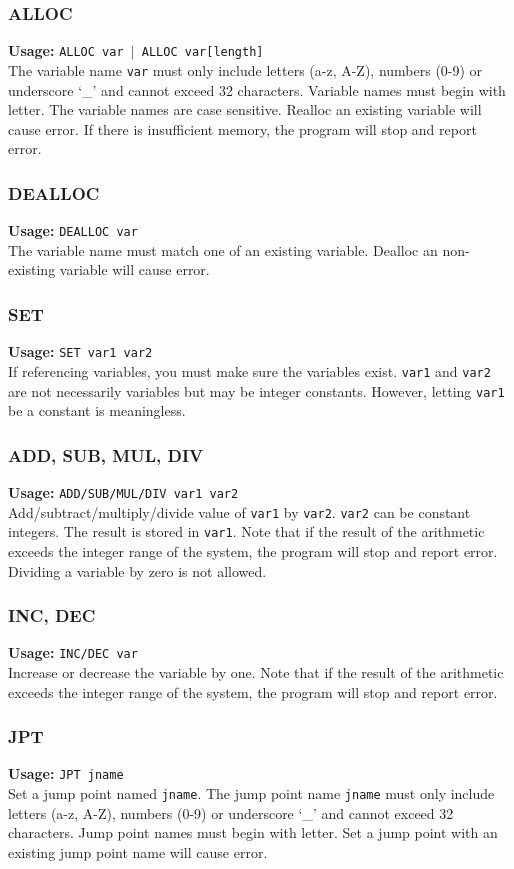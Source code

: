 \documentclass[11pt]{article}
\begin{document}
\subsubsection{ALLOC}
{\bf Usage:} {\tt ALLOC var $|$ ALLOC var[length]}\\
The variable name {\tt var} must only include letters (a-z, A-Z), numbers (0-9) or underscore `\_' and cannot exceed 32 characters. Variable names must begin with letter. The variable names are case sensitive. Realloc an existing variable will cause error. If there is insufficient memory, the program will stop and report error.
\subsubsection{DEALLOC}
{\bf Usage:} {\tt DEALLOC var}\\
The variable name must match one of an existing variable. Dealloc an non-existing variable will cause error.
\subsubsection{SET}
{\bf Usage:} {\tt SET var1 var2}\\
If referencing variables, you must make sure the variables exist. {\tt var1} and {\tt var2} are not necessarily variables but may be integer constants. However, letting {\tt var1} be a constant is meaningless.
\subsubsection{ADD, SUB, MUL, DIV}
{\bf Usage:} {\tt ADD/SUB/MUL/DIV var1 var2}\\
Add/subtract/multiply/divide value of {\tt var1} by {\tt var2}. {\tt var2} can be constant integers. The result is stored in {\tt var1}. Note that if the result of the arithmetic exceeds the integer range of the system, the program will stop and report error. Dividing a variable by zero is not allowed.
\subsubsection{INC, DEC}
{\bf Usage:} {\tt INC/DEC var}\\
Increase or decrease the variable by one. Note that if the result of the arithmetic exceeds the integer range of the system, the program will stop and report error.
\subsubsection{JPT}
{\bf Usage:} {\tt JPT jname}\\
Set a jump point named {\tt jname}. The jump point name {\tt jname} must only include letters (a-z, A-Z), numbers (0-9) or underscore `\_' and cannot exceed 32 characters. Jump point names must begin with letter. Set a jump point with an existing jump point name will cause error.
\end{document}
